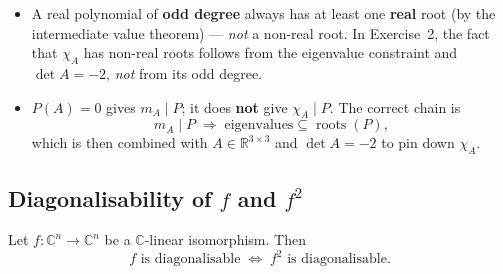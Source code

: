 \begin{warnbox}
\begin{itemize}[leftmargin=1.5em,itemsep=4pt]
  \item A real polynomial of \textbf{odd degree} always has at least one
        \textbf{real} root (by the intermediate value theorem) --- \emph{not}
        a non-real root.  In Exercise~2, the fact that $\chi_A$ has
        non-real roots follows from the eigenvalue constraint and
        $\det A=-2$, \emph{not} from its odd degree.
  \item $P(A)=0$ gives $m_A\mid P$; it does \textbf{not} give $\chi_A\mid P$.
        The correct chain is
        \[
          m_A\mid P \;\Rightarrow\; \text{eigenvalues}\subseteq\operatorname{roots}(P),
        \]
        which is then combined with $A\in\mathbb{R}^{3\times 3}$ and $\det A=-2$ to
        pin down $\chi_A$.
\end{itemize}
\end{warnbox}

\subsection{Diagonalisability of $f$ and $f^2$}
\begin{propbox}
Let $f:\mathbb{C}^n\to\mathbb{C}^n$ be a $\mathbb{C}$-linear isomorphism.  Then
\[
  f \text{ is diagonalisable}
  \;\iff\;
  f^2 \text{ is diagonalisable}.
\]
\end{propbox}

